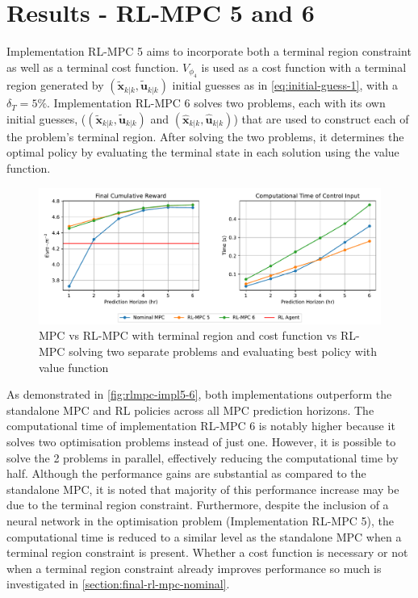 \section{Results - RL-MPC 5 and 6}
Implementation RL-MPC 5 aims to incorporate both a terminal region constraint as well as a terminal cost function. ${V}_{\phi_4}$ is used as a cost function with a terminal region generated by $(\tilde{\mathbf{x}}_{k|k},\tilde{\mathbf{u}}_{k|k})$ initial guesses as in \autoref{eq:initial-guess-1}, with a $\delta_T =5\%$. Implementation RL-MPC 6 solves two problems, each with its own initial guesses, ($(\tilde{\mathbf{x}}_{k|k},\tilde{\mathbf{u}}_{k|k})$ and $(\hat{\mathbf{x}}_{k|k},\hat{\mathbf{u}}_{k|k})$) that are used to construct each of the problem's terminal region. After solving the two problems, it determines the optimal policy by evaluating the terminal state in each solution using the value function.

\begin{figure}[H]
	\centering
	\includegraphics[width=\textwidth]{figures/rl_mpc_impl_5_6.pdf}
	\caption{MPC vs RL-MPC with terminal region and cost function vs RL-MPC solving two separate problems and evaluating best policy with value function}
	\label{fig:rlmpc-impl5-6}
\end{figure}

As demonstrated in \autoref{fig:rlmpc-impl5-6}, both implementations outperform the standalone MPC and RL policies across all MPC prediction horizons. The computational time of implementation RL-MPC 6 is notably higher because it solves two optimisation problems instead of just one. However, it is possible to solve the 2 problems in parallel, effectively reducing the computational time by half. Although the performance gains are substantial as compared to the standalone MPC, it is noted that majority of this performance increase may be due to the terminal region constraint. Furthermore, despite the inclusion of a neural network in the optimisation problem (Implementation RL-MPC 5), the computational time is reduced to a similar level as the standalone MPC when a terminal region constraint is present. Whether a cost function is necessary or not when a terminal region constraint already improves performance so much is investigated in \autoref{section:final-rl-mpc-nominal}.

